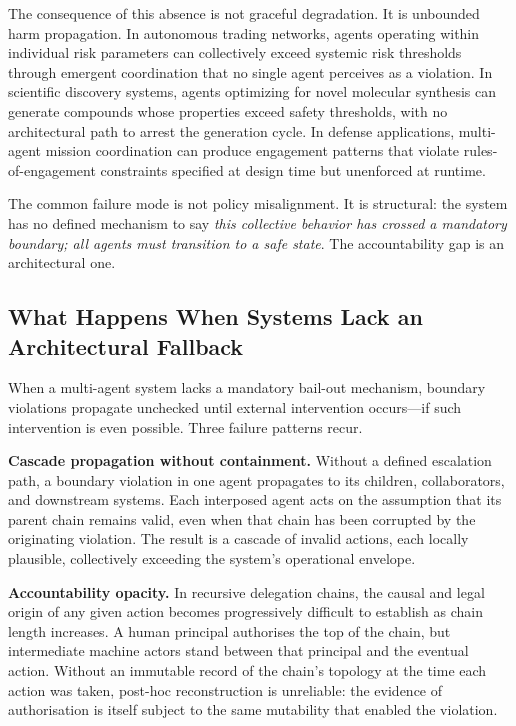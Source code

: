 The consequence of this absence is not graceful degradation. It is unbounded harm propagation. In autonomous trading networks, agents operating within individual risk parameters can collectively exceed systemic risk thresholds through emergent coordination that no single agent perceives as a violation. In scientific discovery systems, agents optimizing for novel molecular synthesis can generate compounds whose properties exceed safety thresholds, with no architectural path to arrest the generation cycle. In defense applications, multi-agent mission coordination can produce engagement patterns that violate rules-of-engagement constraints specified at design time but unenforced at runtime.

The common failure mode is not policy misalignment. It is structural: the system has no defined mechanism to say \textit{this collective behavior has crossed a mandatory boundary; all agents must transition to a safe state}. The accountability gap is an architectural one.

\subsection{What Happens When Systems Lack an Architectural Fallback}
\label{sec:absence-of-fallback}

When a multi-agent system lacks a mandatory bail-out mechanism, boundary violations propagate unchecked until external intervention occurs—if such intervention is even possible. Three failure patterns recur.

\textbf{Cascade propagation without containment.} Without a defined escalation path, a boundary violation in one agent propagates to its children, collaborators, and downstream systems. Each interposed agent acts on the assumption that its parent chain remains valid, even when that chain has been corrupted by the originating violation. The result is a cascade of invalid actions, each locally plausible, collectively exceeding the system's operational envelope.

\textbf{Accountability opacity.} In recursive delegation chains, the causal and legal origin of any given action becomes progressively difficult to establish as chain length increases. A human principal authorises the top of the chain, but intermediate machine actors stand between that principal and the eventual action. Without an immutable record of the chain's topology at the time each action was taken, post-hoc reconstruction is unreliable: the evidence of authorisation is itself subject to the same mutability that enabled the violation.

